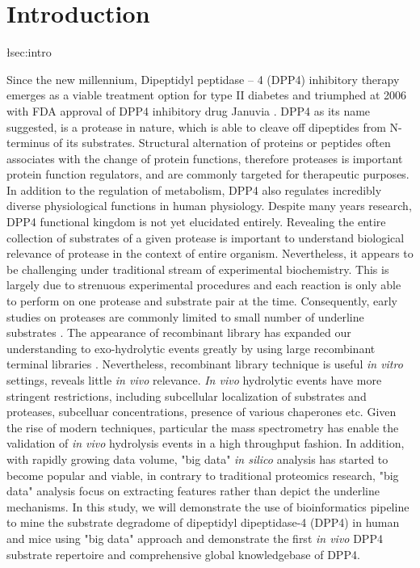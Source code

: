 \section{Introduction}
\lab\l{sec:intro}

Since the new millennium, Dipeptidyl peptidase – 4 (DPP4) inhibitory therapy emerges as a viable treatment option for type II diabetes and triumphed at 2006 with FDA approval of DPP4 inhibitory drug Januvia \cite{RN822}.  DPP4 as its name suggested, is a protease in nature, which is able to cleave off dipeptides from N-terminus of its substrates. Structural alternation of proteins or peptides often associates with the change of protein functions, therefore proteases is important protein function regulators, and are commonly targeted for therapeutic purposes. 
\\
In addition to the regulation of metabolism, DPP4 also regulates incredibly diverse physiological functions in human physiology. Despite many years research, DPP4 functional kingdom is not yet elucidated entirely. Revealing the entire collection of substrates of a given protease is important to understand biological relevance of protease in the context of entire organism. Nevertheless, it appears to be challenging under traditional stream of experimental biochemistry. This is largely due to strenuous experimental procedures and each reaction is only able to perform on one protease and substrate pair at the time. Consequently, early studies on proteases are commonly limited to small number of underline substrates \cite{:1992aa}. The appearance of recombinant library has expanded our understanding to exo-hydrolytic events greatly by using large recombinant terminal libraries \cite{Gupta:2010aa}. Nevertheless, recombinant library technique is useful \textit{in vitro} settings, reveals little \textit{in vivo} relevance. \textit{In vivo} hydrolytic events have more stringent restrictions, including subcellular localization of substrates and proteases, subcelluar concentrations, presence of various chaperones etc. Given the rise of modern techniques, particular the mass spectrometry has enable the validation of \textit{in vivo} hydrolysis events in a high throughput fashion. In addition, with rapidly growing data volume, "big data" \textit{in silico} analysis has started to become popular and viable, in contrary to traditional proteomics research, "big data" analysis focus on extracting features rather than depict the underline mechanisms. In this study, we will demonstrate the use of bioinformatics pipeline to mine the substrate degradome of dipeptidyl dipeptidase-4 (DPP4) in human and mice using "big data" approach and demonstrate the first \textit{in vivo}  DPP4 substrate repertoire and comprehensive global knowledgebase of DPP4.
